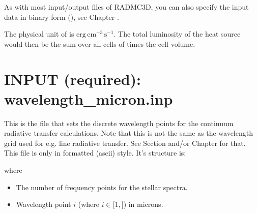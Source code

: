 \documentclass[letterpaper,10pt,english]{sphinxmanual}
\begin{document}
\begin{sphinxVerbatim}[commandchars=\\\{\}]
                                      
\PYG{p}{[}\PYG{p}{]}
\PYG{p}{[}\PYG{p}{]}
\end{sphinxVerbatim}

As with most input/output files of RADMC\sphinxhyphen{}3D, you can also specify the input
data in binary form (), see Chapter
{\hyperref[\detokenize{binaryio:chap-binary-io}]{}}.

The physical unit of  is
\(\mathrm{erg}\,\mathrm{cm}^{-3}\,\mathrm{s}^{-1}\). The total luminosity of
the heat source would then be the sum over all cells of  times the cell volume.


\section{INPUT (required): wavelength\_micron.inp}
\label{\detokenize{inputoutputfiles:input-required-wavelength-micron-inp}}\label{\detokenize{inputoutputfiles:sec-wavelengths}}
This is the file that sets the discrete wavelength points for the continuum
radiative transfer calculations. Note that this is not the same as the
wavelength grid used for e.g. line radiative transfer.  See Section {\hyperref[\detokenize{inputoutputfiles:sec-camera-wavelengths}]{}} and/or Chapter {\hyperref[\detokenize{lineradtrans:chap-line-transfer}]{}} for
that. This file is only in formatted (ascii) style. It’s structure is:

\begin{sphinxVerbatim}[commandchars=\\\{\}]
\PYG{p}{[}\PYG{p}{]}
\PYG{p}{[}\PYG{p}{]}
\end{sphinxVerbatim}

where
\begin{itemize}
\item {} 
 The number of frequency points for the stellar
spectra.

\item {} 
 Wavelength point \(i\) (where \(i\in [1,\)\(]\)) in microns.

\end{itemize}
\end{document}
